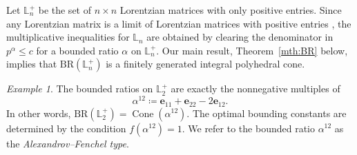 \documentclass{amsart}
\theoremstyle{definition}
\theoremstyle{remark}
\newtheorem{example}[theorem]{Example}
\def\L{\mathbb{L}}
\def\BR{\mathrm{BR}}
\begin{document}
Let $\L_n^+$ be the set of $n\times n$ Lorentzian matrices with only positive entries. Since any Lorentzian matrix is a limit of Lorentzian matrices with positive entries \cite[Section 2]{Branden-Huh}, the multiplicative inequalities for $\L_n$ are obtained by clearing the denominator in $p^\alpha \le c$ for a bounded ratio $\alpha$ on $\L_n^+$.
Our main result, Theorem~\ref{mth:BR} below, implies that $\BR(\L_n^+)$ is a finitely generated integral polyhedral cone. 

\begin{example}
The bounded ratios on $\L_2^+$ are exactly the nonnegative multiples of 
\[
\alpha^{12}\coloneq \mathbf{e}_{11}+\mathbf{e}_{22}-2\mathbf{e}_{12}.%
\]
In other words, $\BR(\L_2^+)=\operatorname{Cone}(\alpha^{12})$. 
The optimal bounding constants are determined by the condition $f(\alpha^{12})=1$. We refer to the bounded ratio $\alpha^{12}$ as the \emph{Alexandrov--Fenchel type}.
\end{example}
\end{document}
